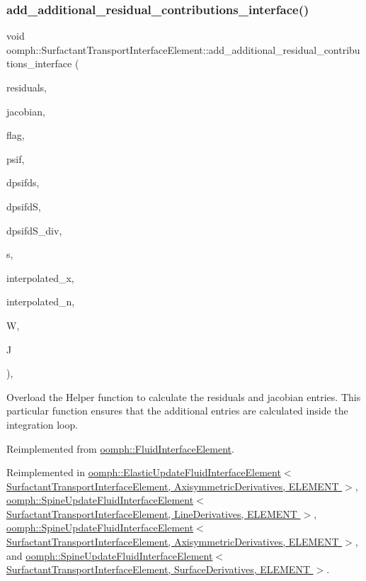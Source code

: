 \subsubsection{\texorpdfstring{add\+\_\+additional\+\_\+residual\+\_\+contributions\+\_\+interface()}{add\_additional\_residual\_contributions\_interface()}}
{\footnotesize\ttfamily void oomph\+::\+Surfactant\+Transport\+Interface\+Element\+::add\+\_\+additional\+\_\+residual\+\_\+contributions\+\_\+interface (\begin{DoxyParamCaption}\item[{Vector$<$ double $>$ \&}]{residuals,  }\item[{Dense\+Matrix$<$ double $>$ \&}]{jacobian,  }\item[{const unsigned \&}]{flag,  }\item[{const Shape \&}]{psif,  }\item[{const D\+Shape \&}]{dpsifds,  }\item[{const D\+Shape \&}]{dpsifdS,  }\item[{const D\+Shape \&}]{dpsifd\+S\+\_\+div,  }\item[{const Vector$<$ double $>$ \&}]{s,  }\item[{const Vector$<$ double $>$ \&}]{interpolated\+\_\+x,  }\item[{const Vector$<$ double $>$ \&}]{interpolated\+\_\+n,  }\item[{const double \&}]{W,  }\item[{const double \&}]{J }\end{DoxyParamCaption})\hspace{0.3cm}{\ttfamily [protected]}, {\ttfamily [virtual]}}



Overload the Helper function to calculate the residuals and jacobian entries. This particular function ensures that the additional entries are calculated inside the integration loop. 



Reimplemented from \hyperlink{classoomph_1_1FluidInterfaceElement_a0bc278bb201b861f47dc846453be4c06}{oomph\+::\+Fluid\+Interface\+Element}.



Reimplemented in \hyperlink{classoomph_1_1ElasticUpdateFluidInterfaceElement_a15c3d2912325ace17676366c1469121f}{oomph\+::\+Elastic\+Update\+Fluid\+Interface\+Element$<$ Surfactant\+Transport\+Interface\+Element, Axisymmetric\+Derivatives, E\+L\+E\+M\+E\+N\+T $>$}, \hyperlink{classoomph_1_1SpineUpdateFluidInterfaceElement_a3958845051cafecd8e73745fc04c7a78}{oomph\+::\+Spine\+Update\+Fluid\+Interface\+Element$<$ Surfactant\+Transport\+Interface\+Element, Line\+Derivatives, E\+L\+E\+M\+E\+N\+T $>$}, \hyperlink{classoomph_1_1SpineUpdateFluidInterfaceElement_a3958845051cafecd8e73745fc04c7a78}{oomph\+::\+Spine\+Update\+Fluid\+Interface\+Element$<$ Surfactant\+Transport\+Interface\+Element, Axisymmetric\+Derivatives, E\+L\+E\+M\+E\+N\+T $>$}, and \hyperlink{classoomph_1_1SpineUpdateFluidInterfaceElement_a3958845051cafecd8e73745fc04c7a78}{oomph\+::\+Spine\+Update\+Fluid\+Interface\+Element$<$ Surfactant\+Transport\+Interface\+Element, Surface\+Derivatives, E\+L\+E\+M\+E\+N\+T $>$}.



